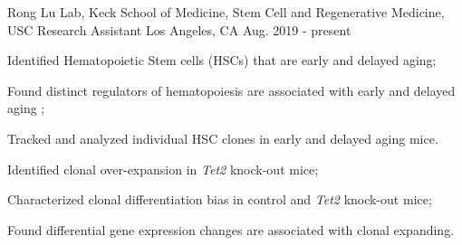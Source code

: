 

\begin{cventries}

    \cventry
        {Rong Lu Lab, Keck School of Medicine, Stem Cell and Regenerative Medicine, USC} %
        {Research Assistant} %
        {Los Angeles, CA} %
        {Aug. 2019 - present} %
        {
        \begin{cvitems} %
                \vspace{0.5em}
                \item[] 
                \vspace{0.5em}
                \item {Identified Hematopoietic Stem cells (HSCs) that are early and delayed aging;}
                \item {Found distinct regulators of hematopoiesis are associated with early and delayed aging  ;}
                \item {Tracked and analyzed individual HSC clones in early and delayed aging mice.}
                \vspace{0.5em}
                \item[] 
                \vspace{0.5em}
                \item {Identified clonal over-expansion in \textit{Tet2} knock-out mice;}
                \item {Characterized clonal differentiation bias in control and \textit{Tet2} knock-out mice;}
                \item {Found differential gene expression changes are associated with clonal expanding.}
                \vspace{0.5em}
                \item[] 

\end{cvitems}}
\end{cventries}
